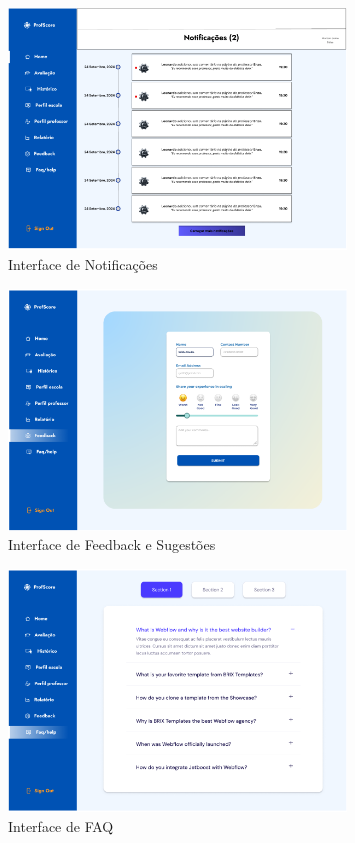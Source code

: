 \documentclass[12pt]{article}
\begin{document}
\begin{figure}[H] %
  \centering
  \includegraphics[width=0.8\textwidth]{interfaces/i8-notificacoes.png}
  \caption{Interface de Notificações}
  \label{fig:i8-notificacoes}
\end{figure}

\begin{figure}[H] %
  \centering
  \includegraphics[width=0.8\textwidth]{interfaces/i9-feedback.png}
  \caption{Interface de Feedback e Sugestões}
  \label{fig:i9-feedback}
\end{figure}

\begin{figure}[H] %
  \centering
  \includegraphics[width=0.8\textwidth]{interfaces/i10-faq.png}
  \caption{Interface de FAQ}
  \label{fig:i10-faq}
\end{figure}
\end{document}
